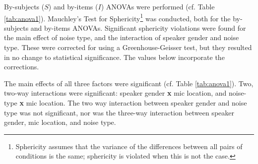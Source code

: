 By-subjects ($S$) and by-items ($I$) ANOVAs were performed (cf. Table \ref{tab:anova1}). Mauchley's Test for Sphericity\footnote{Sphericity assumes that the variance of the differences between all pairs of conditions is the same; sphericity is violated when this is not the case.} was conducted, both for the by-subjects and by-items ANOVAs.  Significant sphericity violations were found for the main effect of noise type, and the interaction of speaker gender and noise type.  These were corrected for using a Greenhouse-Geisser test, but they resulted in no change to statistical significance.  The values below incorporate the corrections.


The main effects of all three factors were significant (cf. Table \ref{tab:anova1}).  Two, two-way interactions were significant: speaker gender \textbf{x} mic location, and noise-type \textbf{x} mic location. The two way interaction between speaker gender and noise type was not significant, nor was the three-way interaction between speaker gender, mic location, and noise type.
  

